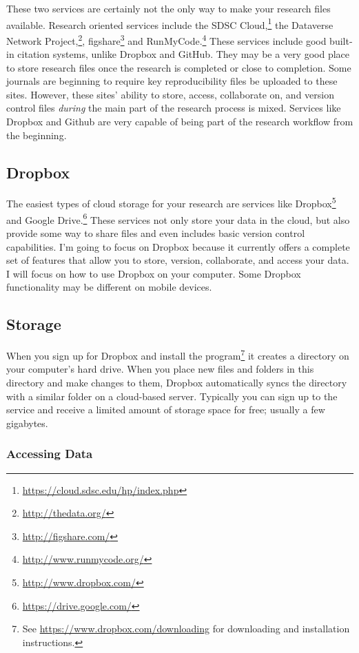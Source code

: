 These two services are certainly not the only way to make your research files available. Research oriented services include the SDSC Cloud,\footnote{\url{https://cloud.sdsc.edu/hp/index.php}} the Dataverse Network Project,\footnote{\url{http://thedata.org/}}, figshare\footnote{\url{http://figshare.com/}} and RunMyCode.\footnote{\url{http://www.runmycode.org/}} These services include good built-in citation systems, unlike Dropbox and GitHub. They may be a very good place to store research files once the research is completed or close to completion. Some journals are beginning to require key reproducibility files be uploaded to these sites. However, these sites' ability to store, access, collaborate on, and version control files \emph{during} the main part of the research process is mixed. Services like Dropbox and Github are very capable of being part of the research workflow from the beginning.

\subsection{Dropbox}

The easiest types of cloud storage for your research are services like Dropbox\footnote{\url{http://www.dropbox.com/}} and Google  Drive.\footnote{\url{https://drive.google.com/}} These services not only store your data in the cloud, but also provide some way to share files and even includes basic version control capabilities. I'm going to focus on Dropbox because it currently offers a complete set of features that allow you to store, version, collaborate, and access your data. I will focus on how to use Dropbox on your computer. Some Dropbox functionality may be different on mobile devices.

\subsection{Storage}

When you sign up for Dropbox and install the program\footnote{See \url{https://www.dropbox.com/downloading} for downloading and installation instructions.} it creates a directory on your computer's hard drive. When you place new files and folders in this directory and make changes to them, Dropbox automatically syncs the directory with a similar folder on a cloud-based server. Typically you can sign up to the service and receive a limited amount of storage space for free; usually a few gigabytes.

\subsubsection{Accessing Data}


